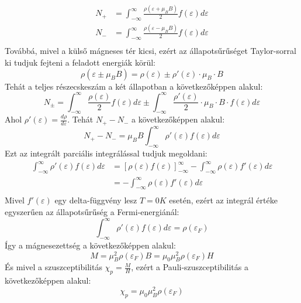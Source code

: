 \documentclass[../main.tex]{subfiles}
\begin{document}
\begin{equation}
    \begin{aligned}
        N_+ & = \int_{-\infty}^{\infty} \frac{\rho(\varepsilon + \mu_B B)}{2} f(\varepsilon) d\varepsilon \\
        N_- & = \int_{-\infty}^{\infty} \frac{\rho(\varepsilon - \mu_B B)}{2} f(\varepsilon) d\varepsilon \\
    \end{aligned}
\end{equation}
Továbbá, mivel a külső mágneses tér kicsi, ezért az állapotsűrűséget Taylor-sorral ki tudjuk fejteni a feladott energiák körül:
\begin{equation}
    \rho(\varepsilon \pm \mu_B B) = \rho(\varepsilon) \pm \rho'(\varepsilon) \cdot \mu_B \cdot B
\end{equation}
Tehát a teljes részecskeszám a két állapotban a következőképpen alakul:
\begin{equation}
    N_\pm = \int_{-\infty}^{\infty} \frac{\rho(\varepsilon)}{2} f(\varepsilon) d\varepsilon \pm \int_{-\infty}^{\infty} \frac{\rho'(\varepsilon)}{2} \cdot \mu_B \cdot B \cdot f(\varepsilon) d\varepsilon
\end{equation}
Ahol $\rho'(\varepsilon) = \frac{d\rho}{d\varepsilon}$. Tehát $N_+ - N_-$ a következőképpen alakul:
\begin{equation}
    N_+ - N_- = \mu_B B \int_{-\infty}^{\infty} \rho'(\varepsilon) f(\varepsilon) d\varepsilon
\end{equation}
Ezt az integrált parciális integrálással tudjuk megoldani:
\begin{equation}
    \begin{aligned}
        \int_{-\infty}^{\infty} \rho'(\varepsilon) f(\varepsilon) d\varepsilon & = \left[ \rho(\varepsilon) f(\varepsilon) \right]_{-\infty}^{\infty} - \int_{-\infty}^{\infty} \rho(\varepsilon) f'(\varepsilon) d\varepsilon \\
        & = - \int_{-\infty}^{\infty} \rho(\varepsilon) f'(\varepsilon) d\varepsilon \\
    \end{aligned}
\end{equation}
Mivel $f'(\varepsilon)$ egy delta-függvény lesz $T = 0K$ esetén, ezért az integrál értéke egyszerűen az állapotsűrűség a Fermi-energiánál:
\begin{equation}
    \int_{-\infty}^{\infty} \rho'(\varepsilon) f(\varepsilon) d\varepsilon = \rho(\varepsilon_F)
\end{equation}
Így a mágnesezettség a következőképpen alakul:
\begin{equation}
    M = \mu_B^2 \rho(\varepsilon_F) B = \mu_0 \mu_B^2 \rho(\varepsilon_F) H
\end{equation}
És mivel a szuszceptibilitás $\chi_p = \frac{M}{H}$, ezért a Pauli-szuszceptibilitás a következőképpen alakul:
\begin{equation}
    \boxed{\chi_p = \mu_0 \mu_B^2 \rho(\varepsilon_F)}
\end{equation}
\end{document}
